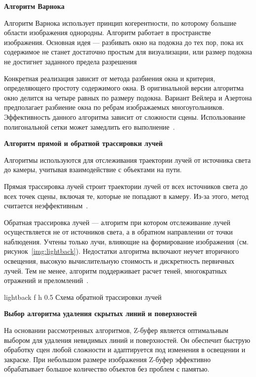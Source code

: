 \fi

\textbf{Алгоритм Варнока}

Алгоритм Варнока использует принцип когерентности, по которому большие области изображения однородны.
Алгоритм работает в пространстве изображения.
Основная идея --- разбивать окно на подокна до тех пор, пока их содержимое не станет достаточно простым для визуализации, или размер подокна не достигнет заданного предела разрешения~\cite{del_line, varnok}

Конкретная реализация зависит от метода разбиения окна и критерия, определяющего простоту содержимого окна.
В оригинальной версии алгоритма окно делится на четыре равных по размеру подокна.
Вариант Вейлера и Азертона предполагает разбиение окна по ребрам изображаемых многоугольников. Эффективность данного алгоритма зависит от сложности сцены. Использование полигональной сетки может замедлить его выполнение~\cite{varnok}.


\textbf{Алгоритм прямой и обратной трассировки лучей} 

Алгоритмы используются для отслеживания траектории лучей от источника света до камеры, учитывая взаимодействие с объектами на пути. 

Прямая трассировка лучей строит траектории лучей от всех источников света до всех точек сцены, включая те, которые не попадают в камеру. Из-за этого, метод считается неэффективным~\cite{ray_tracing}.

Обратная трассировка лучей --- алгоритм при котором отслеживание лучей осуществляется не от источников света, а в обратном направлении от точки наблюдения. 
Учтены только лучи, влияющие на формирование изображения (см. рисунок~\ref{img:lightback}).
Недостатки алгоритма включают неучет вторичного освещения, высокую вычислительную стоимость и дискретность первичных лучей.
Тем не менее, алгоритм поддерживает расчет теней, многократных отражений и преломлений~\cite{ray_tracing}.

	{lightback} %
	{f} %
	{h} %
	{0.5\textwidth} %
	{Схема обратной трассировки лучей} %

\textbf{Выбор алгоритма удаления скрытых линий и поверхностей}

На основании рассмотренных алгоритмов, Z-буфер является оптимальным выбором для удаления невидимых линий и поверхностей. Он обеспечит быструю обработку сцен любой сложности и адаптируется под изменения в освещении и закраске. При небольшом размере изображения Z-буфер эффективно обрабатывает большое количество объектов без проблем с памятью. 

